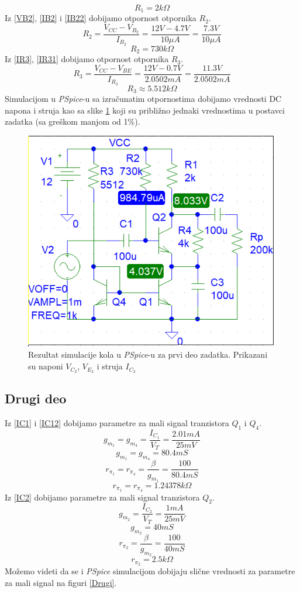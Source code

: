 \documentclass{article}
\begin{document}
            $$\boxed{R_1 = 2k\Omega}$$
            Iz \eqref{VB2}, \eqref{IB2} i \eqref{IB22} dobijamo otpornost otpornika $R_2$.
            $$R_2 = \frac{V_{CC} - V_{B_2}}{I_{B_2}} = \frac{12V - 4.7V}{10\mu A} = \frac{7.3V}{10\mu A}$$
            $$\boxed{R_2 = 730k\Omega}$$
            Iz \eqref{IR3}, \eqref{IR31} dobijamo otpornost otpornika $R_3$.
            $$R_3 = \frac{V_{CC} - V_{BE}}{I_{R_3}} = \frac{12V - 0.7V}{2.0502mA} = \frac{11.3V}{2.0502mA}$$
            $$\boxed{R_3 \approx 5.512k\Omega}$$
            Simulacijom u \textit{PSpice}-u sa izračunatim otpornostima dobijamo vrednosti DC napona i struja kao sa slike \ref{Prvi} koji su približno jednaki vrednostima u postavci zadatka (sa greškom manjom od 1\%).
            \begin{figure}[H]
                \centering
                \includegraphics{Prvi.png}
                \caption{Rezultat simulacije kola u \textit{PSpice}-u za prvi deo zadatka. Prikazani su naponi $V_{C_2}$, $V_{E_2}$ i struja $I_{C_2}$}
                \label{Prvi}
            \end{figure}

        \subsection{Drugi deo}
            Iz \eqref{IC1} i \eqref{IC12} dobijamo parametre za mali signal tranzistora $Q_1$ i $Q_4$.
            $$g_{m_1} = g_{m_4} = \frac{I_{C_1}}{V_T} = \frac{2.01mA}{25mV}$$
            $$\boxed{g_{m_1} = g_{m_4} = 80.4mS}$$
            $$r_{\pi_1} = r_{\pi_4} = \frac{\beta}{g_{m_1}} = \frac{100}{80.4mS}$$
            $$\boxed{r_{\pi_1} = r_{\pi_4} = 1.24378k\Omega}$$
            Iz \eqref{IC2} dobijamo parametre za mali signal tranzistora $Q_2$.
            $$g_{m_2} = \frac{I_{C_2}}{V_T} = \frac{1mA}{25mV}$$
            $$\boxed{g_{m_2} = 40mS}$$
            $$r_{\pi_2} = \frac{\beta}{g_{m_2}} = \frac{100}{40mS}$$
            $$\boxed{r_{\pi_2} = 2.5k\Omega}$$
            Možemo videti da se i \textit{PSpice} simulacijom dobijaju slične vrednosti za parametre za mali signal na figuri \ref{Drugi}.
\end{document}
